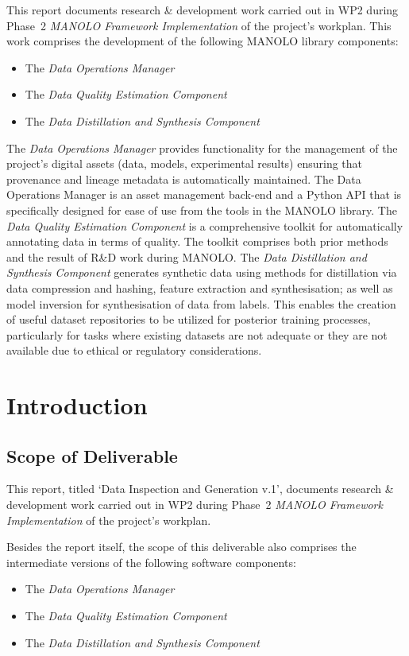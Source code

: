 \documentclass{manolo}
\newcommand{\quotes}[1]{`#1'}
\begin{document}
This report documents research \& development work carried out in WP2
during Phase~2 \emph{MANOLO Framework Implementation} of the project's
workplan. This work comprises the development of the following
MANOLO library components:
%
\begin{itemize}
\item The \emph{Data Operations Manager}
\item The \emph{Data Quality Estimation Component}
\item The \emph{Data Distillation and Synthesis Component}
\end{itemize}
%
The \emph{Data Operations Manager} provides functionality for the
management of the project's digital assets (data, models,
experimental results) ensuring that provenance and lineage metadata
is automatically maintained. The Data Operations Manager is an
asset management back-end and a Python API that is specifically
designed for ease of use from the tools in the MANOLO library.
%
The \emph{Data Quality Estimation Component} is a comprehensive
toolkit for automatically annotating data in terms of quality.
The toolkit comprises both prior methods and the result of R\&D
work during MANOLO.
%
The \emph{Data Distillation and Synthesis Component}
generates synthetic data using methods for distillation via data
compression and hashing, feature extraction and synthesisation;
as well as model inversion for synthesisation of data from labels.
This enables the creation of useful dataset repositories to be
utilized for posterior training processes, particularly for tasks
where existing datasets are not adequate or they are not available
due to ethical or regulatory considerations.

\clearpage

\section{Introduction}

\subsection{Scope of Deliverable}

This report, titled \quotes{Data Inspection and Generation v.1},
documents research \& development work carried out in WP2 during
Phase~2 \emph{MANOLO Framework Implementation} of the project's
workplan.

Besides the report itself, the scope of this deliverable also comprises
the intermediate versions of the following software components:
%
\begin{itemize}
\item The \emph{Data Operations Manager}
\item The \emph{Data Quality Estimation Component}
\item The \emph{Data Distillation and Synthesis Component}
\end{itemize}
\end{document}
